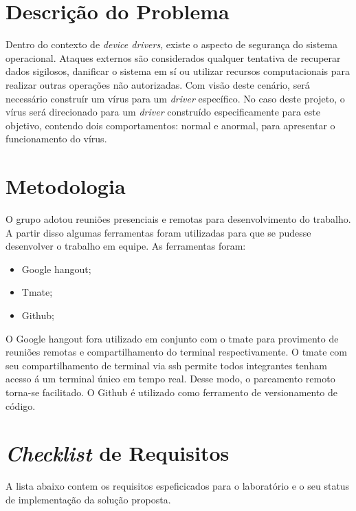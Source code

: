 \section{Descrição do Problema}

Dentro do contexto de \textit{device drivers}, existe o aspecto de segurança do sistema operacional.
Ataques externos são considerados qualquer tentativa de recuperar dados sigilosos, danificar
o sistema em sí ou utilizar recursos computacionais para realizar outras operações não autorizadas.
Com visão deste cenário, será necessário construír um vírus para um \textit{driver} específico.
No caso deste projeto, o vírus será direcionado para um \textit{driver} construído especificamente para
este objetivo, contendo dois comportamentos: normal e anormal, para apresentar o
funcionamento do vírus.

\section{Metodologia}

O grupo adotou reuniões presenciais e remotas para desenvolvimento do trabalho. A partir
disso algumas ferramentas foram utilizadas para que se pudesse desenvolver o trabalho em
equipe. As ferramentas foram:

\begin{itemize}
  \item Google hangout;
  \item Tmate;
  \item Github;
\end{itemize}

O Google hangout fora utilizado em conjunto com o tmate para provimento de reuniões remotas
e compartilhamento do terminal respectivamente. O tmate com seu compartilhamento de terminal
via ssh permite todos integrantes tenham acesso á um terminal único em tempo real. Desse modo,
o pareamento remoto torna-se facilitado. O Github é utilizado como ferramento de versionamento
de código. 

\section{\textit{Checklist} de Requisitos}

A lista abaixo contem os requisitos espeficicados para o laboratório e o
seu status de implementação da solução proposta.

